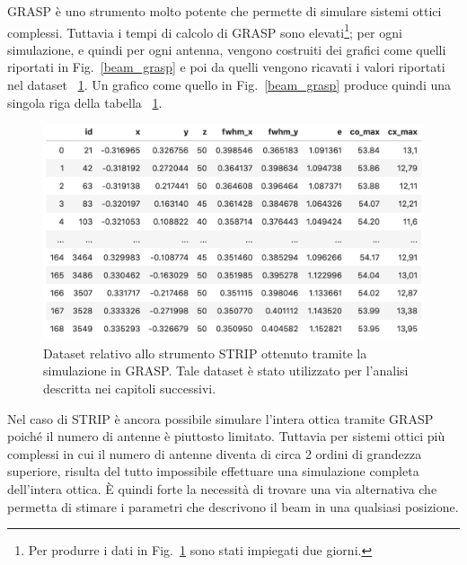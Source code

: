 \documentclass[12pt,a4paper,final]{book}
\begin{document}
GRASP è uno strumento molto potente che permette di simulare sistemi ottici complessi.
Tuttavia i tempi di calcolo di GRASP sono elevati\footnote{Per produrre i dati in Fig.~\ref{dataset} sono stati impiegati due giorni.}; per ogni simulazione, e quindi per ogni antenna, vengono costruiti dei grafici come quelli riportati in Fig.~\ref{beam_grasp} e poi da quelli vengono ricavati i valori riportati nel dataset ~\ref{dataset}.
Un grafico come quello in Fig.~\ref{beam_grasp} produce quindi una singola riga della tabella ~\ref{dataset}.

\begin{figure}[!ht]
	\centering
	\includegraphics[width=0.8\linewidth]{../figures/dataset.png}
	\caption{Dataset relativo allo strumento STRIP ottenuto tramite la simulazione in GRASP. Tale dataset è stato utilizzato per l'analisi descritta nei capitoli successivi.}
	\label{dataset}
\end{figure}

Nel caso di STRIP è ancora possibile simulare l'intera ottica tramite GRASP poiché il numero di antenne è piuttosto limitato. Tuttavia per sistemi ottici più complessi in cui il numero di antenne diventa di circa 2 ordini di grandezza superiore, risulta del tutto impossibile effettuare una simulazione completa dell'intera ottica.
\`E quindi forte la necessità di trovare una via alternativa che permetta di stimare i parametri che descrivono il beam in una qualsiasi posizione.
\end{document}
